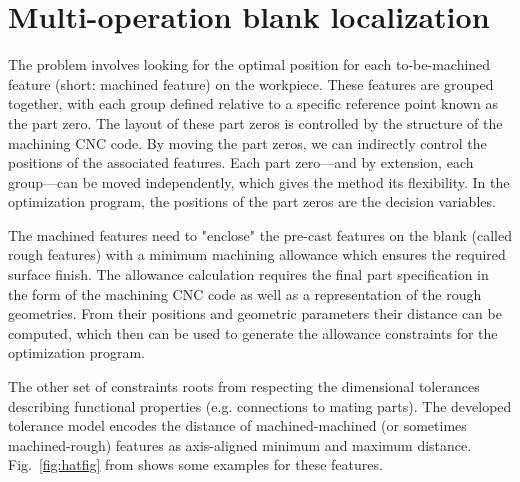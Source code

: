 \documentclass{juliacon}
\begin{document}
\section{Multi-operation blank localization}
\label{sec:algo}

The problem involves looking for the optimal position for each to-be-machined feature (short: machined feature) on the workpiece.
These features are grouped together, with each group defined relative to a specific reference point known as the part zero.
The layout of these part zeros is controlled by the structure of the machining CNC code.
By moving the part zeros, we can indirectly control the positions of the associated features.
Each part zero—and by extension, each group—can be moved independently, which gives the method its flexibility.
In the optimization program, the positions of the part zeros are the decision variables.

The machined features need to "enclose" the pre-cast features on the blank (called rough features) with a minimum machining allowance which ensures the required surface finish.
The allowance calculation requires the final part specification in the form of the machining CNC code as well as a representation of the rough geometries.
From their positions and geometric parameters their distance can be computed, which then can be used to generate the allowance constraints for the optimization program.

The other set of constraints roots from respecting the dimensional tolerances describing functional properties (e.g. connections to mating parts).
The developed tolerance model encodes the distance of machined-machined (or sometimes machined-rough) features as axis-aligned minimum and maximum distance.
Fig.~\ref{fig:hatfig} from \cite{cserteg:2023_Annals} shows some examples for these features.
\end{document}
